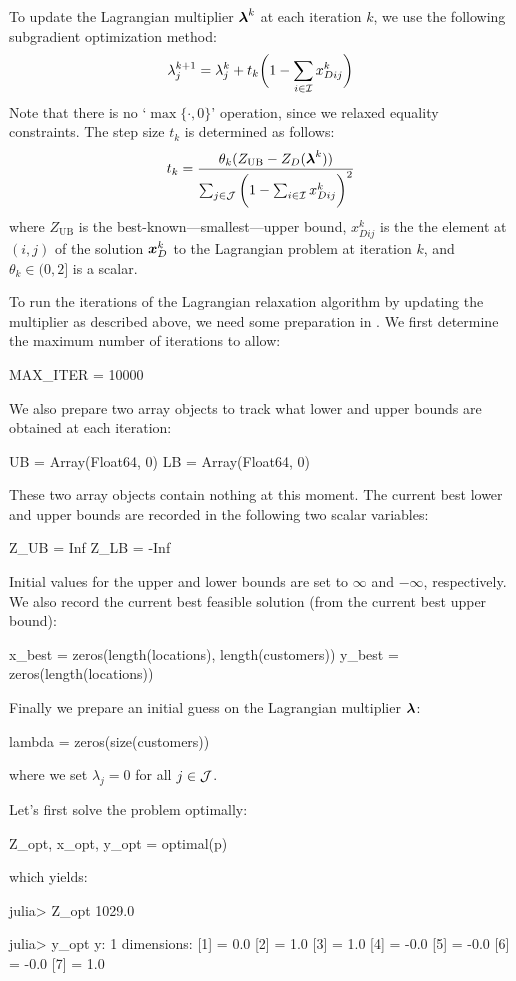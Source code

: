 To update the Lagrangian multiplier $\boldsymbol{\lambda}^k$ at each iteration $k$, we use the following subgradient optimization method:
\[
	\lambda^{k+1}_j = \lambda^k_j + t_k \bigg( 1 - \sum_{i\in\mathcal{I}} x_{Dij}^k \bigg)
\]
Note that there is no `$\max\{\cdot,0\}$' operation, since we relaxed equality constraints. The step size $t_k$ is determined as follows:
\[
	t_k = \frac{ \theta_k ( Z_\text{UB} - Z_D(\boldsymbol{\lambda}^k) ) }
			   {  \sum_{j\in\mathcal{J}} \bigg( 1 - \sum_{i\in\mathcal{I}} x_{Dij}^k \bigg)^2 }
\]
where $Z_\text{UB}$ is the best-known---smallest---upper bound, $x_{Dij}^k$ is the the element at $(i,j)$ of the solution $\boldsymbol{x}^k_D$ to the Lagrangian problem at iteration $k$, and $\theta_k\in(0,2]$ is a scalar.


To run the iterations of the Lagrangian relaxation algorithm by updating the multiplier as described above, we need some preparation in \julia{}. We first determine the maximum number of iterations to allow:
\begin{code}
MAX_ITER = 10000
\end{code}
\noindent We also prepare two array objects to track what lower and upper bounds are obtained at each iteration:
\begin{code}
UB = Array(Float64, 0)
LB = Array(Float64, 0)
\end{code}
\noindent These two array objects contain nothing at this moment. The current best lower and upper bounds are recorded in the following two scalar variables:
\begin{code}
Z_UB = Inf
Z_LB = -Inf
\end{code}
\noindent Initial values for the upper and lower bounds are set to $\infty$ and $-\infty$, respectively. We also record the current best feasible solution (from the current best upper bound):
\begin{code}
x_best = zeros(length(locations), length(customers))
y_best = zeros(length(locations))
\end{code}
\noindent Finally we prepare an initial guess on the Lagrangian multiplier $\boldsymbol{\lambda}$:
\begin{code}
lambda = zeros(size(customers))
\end{code}
\noindent where we set $\lambda_j = 0$ for all $j\in\mathcal{J}$.

Let's first solve the problem optimally:
\begin{code}
Z_opt, x_opt, y_opt = optimal(p)
\end{code}
\noindent which yields:
\begin{code}
julia> Z_opt
1029.0

julia> y_opt
y: 1 dimensions:
[1] = 0.0
[2] = 1.0
[3] = 1.0
[4] = -0.0
[5] = -0.0
[6] = -0.0
[7] = 1.0
\end{code}

